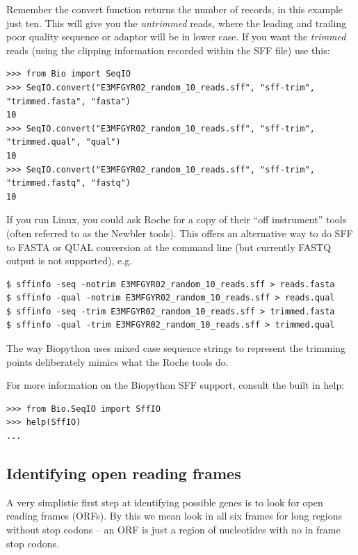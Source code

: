 \documentclass{report}
\begin{document}
\noindent Remember the convert function returns the number of records, in
this example just ten. This will give you the \emph{untrimmed} reads, where
the leading and trailing poor quality sequence or adaptor will be in lower
case. If you want the \emph{trimmed} reads (using the clipping information
recorded within the SFF file) use this:

\begin{verbatim}
>>> from Bio import SeqIO
>>> SeqIO.convert("E3MFGYR02_random_10_reads.sff", "sff-trim", "trimmed.fasta", "fasta")
10
>>> SeqIO.convert("E3MFGYR02_random_10_reads.sff", "sff-trim", "trimmed.qual", "qual")
10
>>> SeqIO.convert("E3MFGYR02_random_10_reads.sff", "sff-trim", "trimmed.fastq", "fastq")
10
\end{verbatim}

If you run Linux, you could ask Roche for a copy of their ``off instrument''
tools (often referred to as the Newbler tools). This offers an alternative way to
do SFF to FASTA or QUAL conversion at the command line (but currently FASTQ output
is not supported), e.g.

\begin{verbatim}
$ sffinfo -seq -notrim E3MFGYR02_random_10_reads.sff > reads.fasta
$ sffinfo -qual -notrim E3MFGYR02_random_10_reads.sff > reads.qual
$ sffinfo -seq -trim E3MFGYR02_random_10_reads.sff > trimmed.fasta
$ sffinfo -qual -trim E3MFGYR02_random_10_reads.sff > trimmed.qual
\end{verbatim}

\noindent The way Biopython uses mixed case sequence strings to represent
the trimming points deliberately mimics what the Roche tools do.

For more information on the Biopython SFF support, consult the built in help:

\begin{verbatim}
>>> from Bio.SeqIO import SffIO
>>> help(SffIO)
...
\end{verbatim}

\subsection{Identifying open reading frames}

A very simplistic first step at identifying possible genes is to look for
open reading frames (ORFs).  By this we mean look in all six frames for long
regions without stop codons -- an ORF is just a region of nucleotides with
no in frame stop codons.
\end{document}
